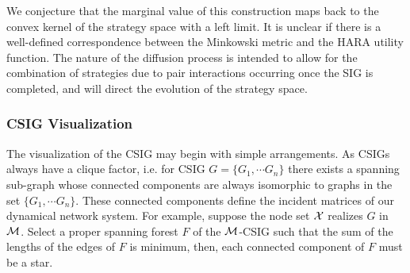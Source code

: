 We conjecture that the marginal value of this construction maps back to the
convex kernel of the strategy space with a left limit. It is unclear if there is
a well-defined correspondence between the Minkowski metric and the HARA utility
function. The nature of the diffusion process is intended to allow for the
combination of strategies due to pair interactions occurring once the SIG is
completed, and will direct the evolution of the strategy space.

\subsubsection{CSIG Visualization}

The visualization of the CSIG may begin with simple arrangements.
As CSIGs always have a clique factor, i.e. for CSIG $G = \lbrace G_1,\cdots
G_n\rbrace$ there exists a spanning sub-graph whose connected components are always isomorphic to graphs in the set $\lbrace G_1,\cdots G_n\rbrace$. These connected components define the incident matrices of our dynamical network system. For example, suppose the node set $\mathcal{X}$ realizes $G$ in $\mathcal{M}$. Select a proper spanning forest $F$
of the $\mathcal{M}$-CSIG such that the sum of the lengths of the edges of $F$ is minimum, then, each connected component of $F$ must be a star.


